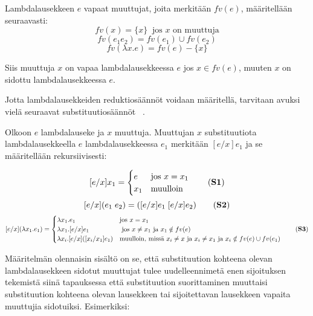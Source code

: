 \begin{maar}
Lambdalausekkeen $e$ vapaat muuttujat, joita merkitään $fv(e)$, määritellään seuraavasti: 
\[fv(x) = \{x\}\ \text{ jos } x \text{ on muuttuja} \]
\[fv(e_{1}e_{2}) = fv(e_{1}) \cup fv(e_{2}) \]
\[ fv(\lambda x.e) = fv(e) - \{x\} \]

Siis muuttuja $x$ on vapaa lambdalausekkeessa $e$ jos $x \in fv(e)$, muuten $x$ on sidottu lambdalausekkeessa $e$.
\end{maar} 

\par

Jotta lambdalausekkeiden reduktiosäännöt voidaan määritellä, tarvitaan avuksi vielä seuraavat substituutiosäännöt ~\cite[s.~8]{Hudak89}.

\begin{maar}[substituutiosäännöt]
Olkoon $e$ lambdalauseke ja $x$ muuttuja. Muuttujan $x$ substituutiota lambdalausekkeella $e$ lambdalausekkeessa $e_{1}$ merkitään $[e/x] e_{1}$ ja se määritellään rekursiivisesti:  

\[[e/x]x_{1} = 
        \begin{cases}
                e & \text{jos } x = x_{1} \\
                x_{1} & \text{muulloin}
        \end{cases}
        \label{eq:S1} \tag{\textbf{S1}}
\]
\[ [e/x](e_{1} \; e_{2}) = ([e/x]e_{1} \; [e/x]e_{2}) \label{eq:S2} \tag{\textbf{S2}}\]
\[[e/x](\lambda x_{1}.e_{1}) = 
        \begin{cases}
                \lambda x_{1}.e_{1} & \text{jos } x = x_{1} \\
                \lambda x_{1}.[e/x]e_{1} & \text{ jos } x \neq x_{1} \text{ ja } x_{1} \notin fv(e) \\
                \lambda x_{i}.[e/x]([x_{i}/x_{1}]e_{1}) & \text{muulloin, missä } x_{i} \neq x \text { ja } x_{i} \neq x_{1} \text{ ja } x_{i} \notin fv(e) \cup fv(e_{1})
        \end{cases}
 \label{eq:S3} \tag{\textbf{S3}}       
\]
\end{maar} 

Määritelmän olennaisin sisältö on se, että substituution kohteena olevan lambdalausekkeen sidotut muuttujat tulee uudelleennimetä enen sijoituksen tekemistä siinä tapauksessa että substituution suorittaminen muuttaisi substituution kohteena olevan lausekkeen tai sijoitettavan lausekkeen vapaita muuttujia sidotuiksi. Esimerkiksi: \\


